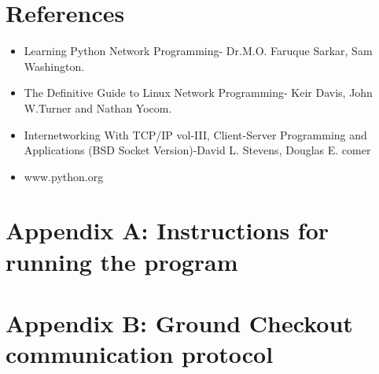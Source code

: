 \documentclass[12pt, a4paper]{report}
\begin{document}
\chapter*{References}
	\begin{itemize}
			\item Learning Python Network Programming- Dr.M.O. Faruque Sarkar, Sam
					Washington.
			\item The Definitive Guide to Linux Network Programming- Keir Davis, John
					W.Turner and Nathan Yocom.
			\item Internetworking With TCP/IP vol-III, Client-Server Programming and
					Applications (BSD Socket Version)-David L. Stevens, Douglas E. comer
			\item www.python.org
	\end{itemize}

\appendix
\chapter*{Appendix A: Instructions for running the program}



\chapter*{Appendix B: Ground Checkout communication protocol}

\end{document}

